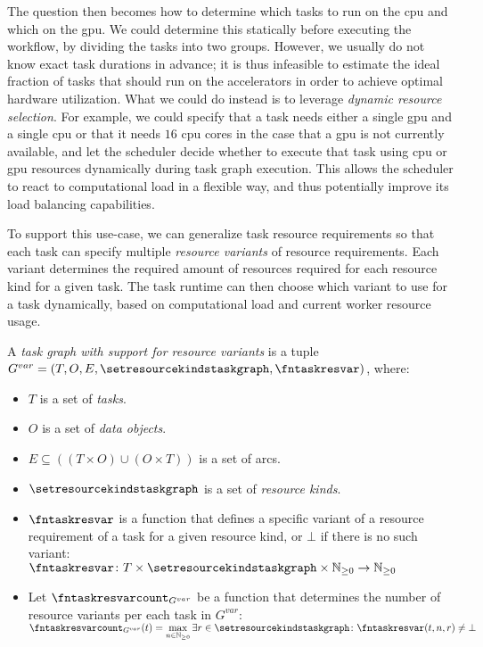 The question then becomes how to determine which tasks to run on the \gls{cpu} and
which on the \gls{gpu}. We could determine this statically before executing the
workflow, by dividing the tasks into two groups. However, we usually do not know exact task
durations in advance; it is thus infeasible to estimate the ideal fraction of tasks that should
run on the accelerators in order to achieve optimal hardware utilization. What we could do instead
is to leverage \emph{dynamic resource selection}. For example, we could specify that a task needs either a
single \gls{gpu} and a single \gls{cpu} or that it needs
$16$ \gls{cpu} cores in the case that a \gls{gpu} is
not currently available, and let the scheduler decide whether to execute that task using
\gls{cpu} or \gls{gpu} resources dynamically during task graph
execution. This allows the scheduler to react to computational load in a flexible way, and thus
potentially improve its load balancing capabilities.

To support this use-case, we can generalize task resource requirements so that each task can
specify multiple \emph{resource variants} of resource requirements. Each variant determines the
required amount of resources required for each resource kind for a given task. The task runtime can
then choose which variant to use for a task dynamically, based on computational load and current
worker resource usage.

\vspace{2mm} A
\emph{task graph with support for resource variants} is a tuple \\
$G^{var} = (T, O, E, \setresourcekindstaskgraph, \fntaskresvar)$, where:
\begin{itemize}[itemsep=0pt]
	\item $T$ is a set of \emph{tasks}.
	\item $O$ is a set of \emph{data objects}.
	\item $E \subseteq ((T\times{}O) \cup (O\times{}T))$ is a set of arcs.
	\item $\setresourcekindstaskgraph$ is a set of \emph{resource kinds}.
	\item $\fntaskresvar$ is a function that defines a specific variant of a resource
	requirement of a task for a given resource kind, or $\bot$ if there is no such variant: \\
	$\fntaskresvar\colon T \times \setresourcekindstaskgraph \times \mathbb{N}_{\geq{}0} \rightarrow \mathbb{N}_{\geq{}0}$
	\item Let $\fntaskresvarcount_{G^{var}}$ be a function that determines the number of resource
	variants per each task in $G^{var}$: \\
	$\fntaskresvarcount_{G^{var}}(t) = \max\limits_{n\in\mathbb{N}_{\geq{}0}} \exists r\in\setresourcekindstaskgraph\colon \fntaskresvar(t, n, r) \neq \bot$
\end{itemize}

